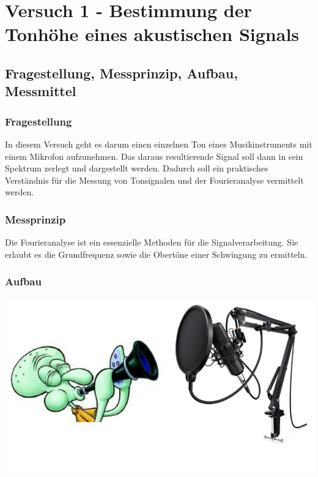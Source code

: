 \chapter{Versuch 1 - Bestimmung der Tonhöhe eines akustischen Signals}
\label{chap:VERSUCH_1}


\section{Fragestellung, Messprinzip, Aufbau, Messmittel}
\label{chap:VERSUCH_1_FRAGESTELLUNG}

\subsection*{Fragestellung}
	In diesem Versuch geht es darum einen einzelnen Ton eines Musikinstruments mit einem Mikrofon aufzunehmen.
Das daraus resultierende Signal soll dann in sein Spektrum zerlegt und dargestellt werden.
Dadurch soll ein praktisches Verständnis für die Messung von Tonsignalen und der Fourieranalyse vermittelt werden.
	
\subsection*{Messprinzip}
Die Fourieranalyse ist ein essenzielle Methoden für die Signalverarbeitung. Sie erlaubt es die Grundfrequenz sowie die Obertöne einer Schwingung zu ermitteln.

\subsection*{Aufbau}

\includegraphics[scale=0.4]{media/Versuchaufbau.png}
\label{fig:Aufbau}

